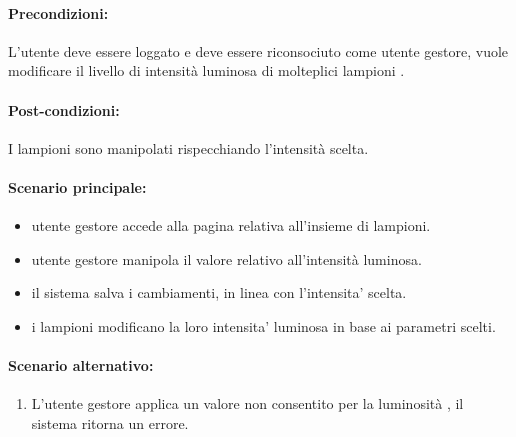 \paragraph{Precondizioni:}
L'utente deve essere loggato e deve essere riconsociuto come utente gestore,
vuole modificare il livello di intensità luminosa di molteplici lampioni .


\paragraph{Post-condizioni:}
I lampioni sono manipolati rispecchiando l'intensità scelta.

\paragraph{Scenario principale:}
\begin{itemize}
    \item utente gestore accede alla pagina relativa all'insieme di lampioni.
    \item utente gestore manipola il valore relativo all'intensità luminosa.
    \item il sistema salva i cambiamenti, in linea con l'intensita' scelta.
    \item i lampioni modificano la loro intensita' luminosa in base ai parametri scelti.
\end{itemize}

\paragraph{Scenario alternativo:}
\begin{enumerate}
    \item L'utente gestore applica un valore non consentito per la luminosità , il sistema ritorna un errore.
\end{enumerate}

